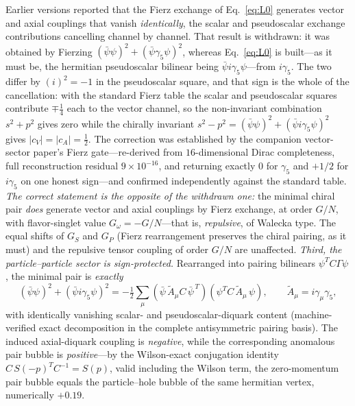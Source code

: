 \documentclass[11pt,a4paper]{article}
\begin{document}
Earlier versions reported that the Fierz exchange of
Eq.~\eqref{eq:L0} generates vector and axial couplings that vanish
\emph{identically}, the scalar and pseudoscalar exchange
contributions cancelling channel by channel.  That result is
withdrawn: it was obtained by Fierzing
$(\bar\psi\psi)^2 + (\bar\psi\gamma_5\psi)^2$, whereas
Eq.~\eqref{eq:L0} is built---as it must be, the hermitian
pseudoscalar bilinear being $\bar\psi i\gamma_5\psi$---from
$i\gamma_5$.  The two differ by $(i)^2 = -1$ in the pseudoscalar
square, and that sign is the whole of the cancellation: with the
standard Fierz table the scalar and pseudoscalar squares
contribute $\mp\tfrac{1}{4}$ each to the vector channel, so the
non-invariant combination $s^2 + p^2$ gives zero while the
chirally invariant $s^2 - p^2 = (\bar\psi\psi)^2 +
(\bar\psi i\gamma_5\psi)^2$ gives $|c_V| = |c_A| = \tfrac{1}{2}$.
The correction was established by the companion vector-sector
paper's Fierz gate---re-derived from $16$-dimensional Dirac
completeness, full reconstruction residual
$9\times10^{-16}$, and returning exactly $0$ for $\gamma_5$ and
$+1/2$ for $i\gamma_5$ on one honest sign---and confirmed
independently against the standard table.
\emph{The correct statement is the opposite of the withdrawn one:}
the minimal chiral pair \emph{does} generate vector and axial
couplings by Fierz exchange, at order $G/N$, with flavor-singlet
value $G_\omega = -G/N$---that is, \emph{repulsive}, of Walecka
type.  The equal shifts of $G_S$ and $G_P$ (Fierz rearrangement
preserves the chiral pairing, as it must) and the repulsive tensor
coupling of order $G/N$ are unaffected.
\emph{Third, the particle--particle sector is sign-protected.}
Rearranged into pairing bilinears
$\psi^T C\Gamma\psi$, the minimal pair is \emph{exactly}
\begin{equation}
(\bar\psi\psi)^2 + (\bar\psi i\gamma_5\psi)^2
= -\tfrac{1}{2}\sum_\mu
(\bar\psi\,\tilde{A}_\mu C\,\bar\psi^{\,T})
(\psi^T C\,\tilde{A}_\mu\,\psi),
\qquad \tilde{A}_\mu = i\gamma_\mu\gamma_5,
\label{eq:pairdecomp}
\end{equation}
with identically vanishing scalar- and pseudoscalar-diquark
content (machine-verified exact decomposition in the complete
antisymmetric pairing basis).  The induced axial-diquark coupling
is \emph{negative}, while the corresponding anomalous pair bubble
is \emph{positive}---by the Wilson-exact conjugation identity
$C\,S(-p)^{T}C^{-1} = S(p)$, valid including the Wilson term, the
zero-momentum pair bubble equals the particle--hole bubble of the
same hermitian vertex, numerically $+0.19$.
\end{document}
